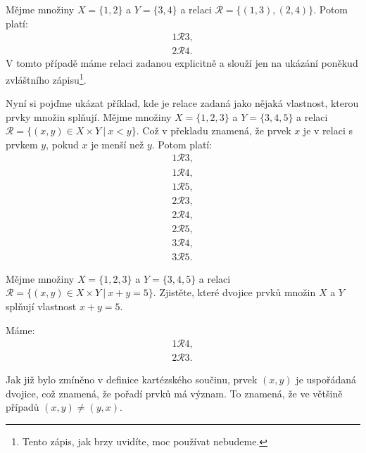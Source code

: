 \begin{example}
  Mějme množiny $X = \{1, 2\}$ a $Y = \{3, 4\}$ a relaci $\mathcal R = \{(1, 3), (2, 4)\}$. Potom platí:
  \begin{align*}
    1\mathcal R3,\\
    2\mathcal R4.
  \end{align*}
V tomto případě máme relaci zadanou explicitně a slouží jen na ukázání poněkud zvláštního zápisu\footnote{Tento zápis, jak brzy uvidíte, moc používat nebudeme.}.
\end{example}

\begin{example}
  Nyní si pojďme ukázat příklad, kde je relace zadaná jako nějaká vlastnost, kterou prvky množin splňují. Mějme množiny $X = \{1, 2, 3\}$ a $Y = \{3, 4, 5\}$ a relaci $\mathcal R = \{(x, y)\in X\times Y\ |\ x < y\}$. Což v překladu znamená, že prvek $x$ je v relaci s prvkem $y$, pokud $x$ je menší než $y$. Potom platí:
  \begin{align*}
    1\mathcal R3,\\
    1\mathcal R4,\\
    1\mathcal R5,\\
    2\mathcal R3,\\
    2\mathcal R4,\\
    2\mathcal R5,\\
    3\mathcal R4,\\
    3\mathcal R5.
  \end{align*}

\end{example}

\begin{problem}
  Mějme množiny $X = \{1, 2, 3\}$ a $Y = \{3, 4, 5\}$ a relaci $\mathcal R = \{(x, y)\in X\times Y\ |\ x + y = 5\}$. Zjistěte, které dvojice prvků množin $X$ a $Y$ splňují vlastnost $x + y = 5$.
\end{problem}

\begin{solution}
  Máme:
  \begin{align*}
    1\mathcal R4,\\
    2\mathcal R3.
  \end{align*}
\end{solution}

\begin{note}
  Jak již bylo zmíněno v definice kartézského součinu, prvek $(x, y)$ je uspořádaná dvojice, což znamená, že pořadí prvků má význam. To znamená, že ve většině případů $(x, y)\neq(y, x)$. 
\end{note}


